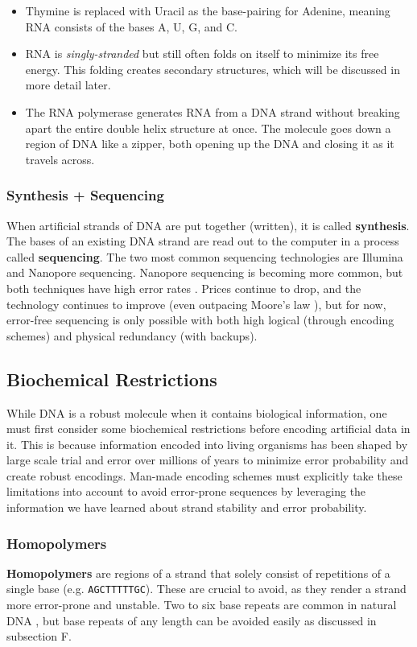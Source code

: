 \documentclass[a4paper,conference]{IEEEtran}
\begin{document}
\begin{itemize}
    \item Thymine is replaced with Uracil as the base-pairing for Adenine, meaning RNA consists of the bases A, U, G, and C.
    \item RNA is \textit{singly-stranded} but still often folds on itself to minimize its free energy. This folding creates secondary structures, which will be discussed in more detail later.
    \item The RNA polymerase generates RNA from a DNA strand without breaking apart the entire double helix structure at once. The molecule goes down a region of DNA like a zipper, both opening up the DNA and closing it as it travels across.
\end{itemize}

\subsubsection{Synthesis + Sequencing}
When artificial strands of DNA are put together (written), it is called \textbf{synthesis}. The bases of an existing DNA strand are read out to the computer in a process called \textbf{sequencing}. The two most common sequencing technologies are Illumina and Nanopore sequencing. Nanopore sequencing is becoming more common, but both techniques have high error rates \cite{organick_random_2018}. Prices continue to drop, and the technology continues to improve (even outpacing Moore's law \cite{bornholt_dna-based_2016}), but for now, error-free sequencing is only possible with both high logical (through encoding schemes) and physical redundancy (with backups).


\subsection{Biochemical Restrictions}
While DNA is a robust molecule when it contains biological information, one must first consider some biochemical restrictions before encoding artificial data in it. This is because information encoded into living organisms has been shaped by large scale trial and error over millions of years to minimize error probability and create robust encodings. Man-made encoding schemes must explicitly take these limitations into account to avoid error-prone sequences by leveraging the information we have learned about strand stability and error probability.

\subsubsection{Homopolymers}
\textbf{Homopolymers} are regions of a strand that solely consist of repetitions of a single base (e.g. \texttt{AGCTTTTTGC}). These are crucial to avoid, as they render a strand more error-prone \cite{shendure_next-generation_2008} and unstable. Two to six base repeats are common in natural DNA \cite{ivady_analytical_2018}, but base repeats of any length can be avoided easily as discussed in subsection F.
\end{document}
